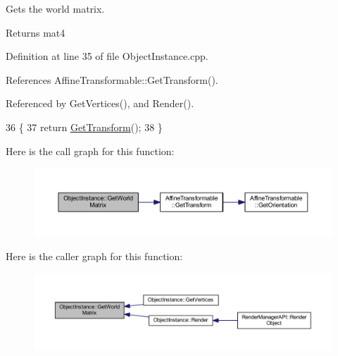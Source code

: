 Gets the world matrix. 

\begin{DoxyReturn}{Returns}
mat4
\end{DoxyReturn}


Definition at line 35 of file Object\+Instance.\+cpp.



References Affine\+Transformable\+::\+Get\+Transform().



Referenced by Get\+Vertices(), and Render().


\begin{DoxyCode}
36 \{
37   \textcolor{keywordflow}{return} \hyperlink{class_affine_transformable_a3eb990ab0b75ad30d3bb667e437d8606}{GetTransform}();
38 \}
\end{DoxyCode}


Here is the call graph for this function\+:\nopagebreak
\begin{figure}[H]
\begin{center}
\leavevmode
\includegraphics[width=350pt]{class_object_instance_aa9a660435b76ef436a5dcdb24d897c4f_cgraph}
\end{center}
\end{figure}




Here is the caller graph for this function\+:
\nopagebreak
\begin{figure}[H]
\begin{center}
\leavevmode
\includegraphics[width=350pt]{class_object_instance_aa9a660435b76ef436a5dcdb24d897c4f_icgraph}
\end{center}
\end{figure}


